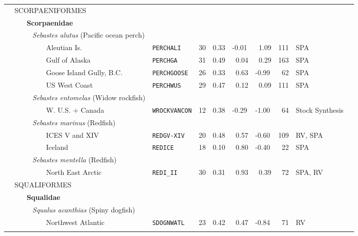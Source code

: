 \begin{flushleft}
\begin{tabular*}{7.1in}{llllllllll}
&{\normalsize SCORPAENIFORMES}&~&~&~&~&~&~&~  & \\ 
&{\bf~~~Scorpaenidae}&~&~&~&~&~&~&~  & \\ 
&{\it~~~~~Sebastes alutus} (Pacific ocean perch)&~&~&~&~&~&~&~  & \\ 
&~~~~~~~~~Aleutian Is.&{\tt PERCHALI}&30&0.33&-0.01&~1.09&111&SPA  & \\ 
&~~~~~~~~~Gulf of Alaska&{\tt PERCHGA}&31&0.49&~0.04&~0.29&163&SPA  & \\ 
&~~~~~~~~~Goose Island Gully, B.C.&{\tt PERCHGOOSE}&26&0.33&~0.63&-0.99&~62&SPA  & \\ 
&~~~~~~~~~US West Coast&{\tt PERCHWUS}&29&0.47&~0.12&~0.09&111&SPA  & \\ 
&{\it~~~~~Sebastes entomelas} (Widow rockfish)&~&~&~&~&~&~&~  & \\ 
&~~~~~~~~~W. U.S. + Canada&{\tt WROCKVANCON}&12&0.38&-0.29&-1.00&~64&Stock Synthesis  & \\ 
&{\it~~~~~Sebastes marinus} (Redfish)&~&~&~&~&~&~&~  & \\ 
&~~~~~~~~~ICES V and XIV&{\tt REDGV-XIV}&20&0.48&~0.57&-0.60&109&RV, SPA  & \\ 
&~~~~~~~~~Iceland&{\tt REDICE}&18&0.10&~0.80&-0.40&~22&SPA  & \\ 
&{\it~~~~~Sebastes mentella} (Redfish)&~&~&~&~&~&~&~  & \\ 
&~~~~~~~~~North East Arctic&{\tt REDI\_II}&30&0.31&~0.93&~0.39&~72&SPA, RV  & \\ 
&{\normalsize SQUALIFORMES}&~&~&~&~&~&~&~  & \\ 
&{\bf~~~Squalidae}&~&~&~&~&~&~&~  & \\ 
&{\it~~~~~Squalus acanthias} (Spiny dogfish)&~&~&~&~&~&~&~  & \\ 
&~~~~~~~~~Northwest Atlantic&{\tt SDOGNWATL}&23&0.42&~0.47&-0.84&~71&RV  & \\ 
&&&&&&&&&\\ 
\hline 
\end{tabular*} 
\end{flushleft}
 
